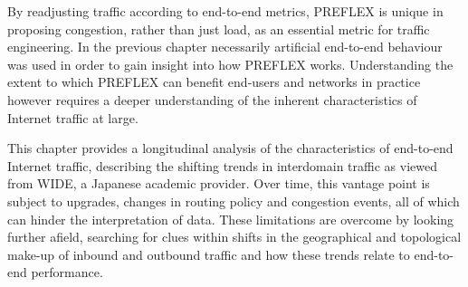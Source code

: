 By readjusting traffic according to end-to-end metrics, \ac{PREFLEX} is unique in proposing congestion, rather than just load, as an essential metric for traffic engineering.
In the previous chapter necessarily artificial end-to-end behaviour was used in order to gain insight into how \ac{PREFLEX} works.
Understanding the extent to which \ac{PREFLEX} can benefit end-users and networks in practice however requires a deeper understanding of the inherent characteristics of Internet traffic at large.

This chapter provides a longitudinal analysis of the characteristics of end-to-end Internet traffic, describing the shifting trends in interdomain traffic as viewed from \acs{WIDE}, a Japanese academic provider.
Over time, this vantage point is subject to upgrades, changes in routing policy and congestion events, all of which can hinder the interpretation of data.
These limitations are overcome by looking further afield, searching for clues within shifts in the geographical and topological make-up of inbound and outbound traffic and how these trends relate to end-to-end performance.
